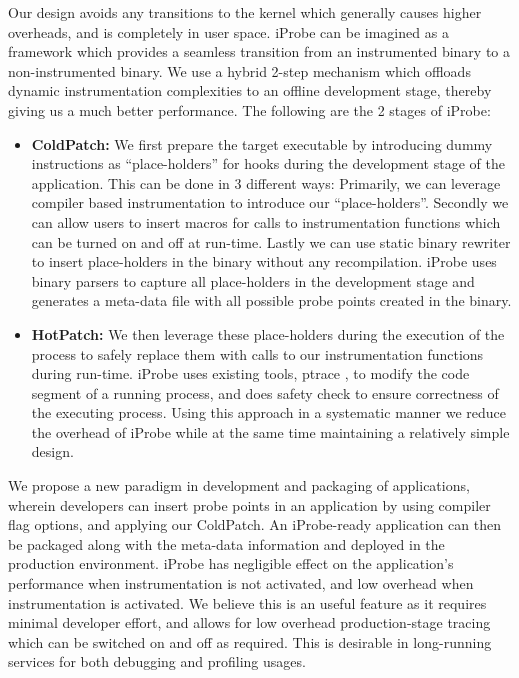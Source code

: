 Our design avoids any transitions to the kernel which generally causes higher overheads, and is completely in user space. 
iProbe can be imagined as a framework which provides a seamless transition from an instrumented binary to a non-instrumented binary.
We use a hybrid 2-step mechanism which offloads dynamic instrumentation complexities to an offline development stage, thereby giving us a much better performance.
The following are the 2 stages of iProbe:
\begin{itemize}

\item \textbf{ColdPatch: } We first prepare the target executable by introducing dummy instructions as ``place-holders'' for hooks during the development stage of the application. 
This can be done in 3 different ways: Primarily, we can leverage compiler based instrumentation to introduce our ``place-holders''. 
Secondly we can allow users to insert macros for calls to instrumentation functions which can be turned on and off at run-time. 
Lastly we can use static binary rewriter to insert place-holders in the binary without any recompilation.  
iProbe uses binary parsers to capture all place-holders in the development stage and generates a meta-data file with all possible probe points created in the binary.

\item \textbf{HotPatch: } We then leverage these place-holders during the execution of the process to safely replace them with calls to our instrumentation functions during run-time. 
iProbe uses existing tools, ptrace \cite{ptrace}, to modify the code segment of a running process, and does safety check to ensure correctness of the executing process. 
Using this approach in a systematic manner we reduce the overhead of iProbe while at the same time maintaining a relatively simple design. 


\end{itemize}

We propose a new paradigm in development and packaging of applications, wherein developers can insert probe points in an application by using compiler flag options, and applying our ColdPatch.
An iProbe-ready application can then be packaged along with the meta-data information and deployed in the production environment.
iProbe has negligible effect on the application's performance when instrumentation is not activated, and low overhead when instrumentation is activated. 
We believe this is an useful feature as it requires minimal developer effort, and allows for low overhead production-stage tracing which can be switched on and off as required. 
This is desirable in long-running services for both debugging and profiling usages. 

